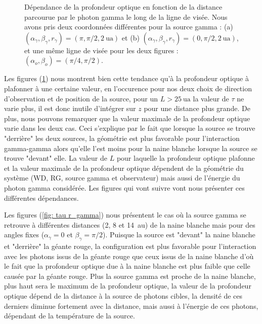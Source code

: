 \documentclass[a4paper,12pt,twoside]{article}
\begin{document}
\begin{figure}[H]
	\centering
    \hfill
    \hfill
    \caption{Dépendance de la profondeur optique en fonction de la distance parcourue par le photon gamma le long de la ligne de visée. Nous avons pris deux coordonnées différentes pour la source gamma : (a) $(\alpha_\gamma, \beta_\gamma, r_\gamma) = (\pi, \pi/2, \SI{2}{\astronomicalunit})$ et (b) $(\alpha_\gamma, \beta_\gamma, r_\gamma) = (0, \pi/2, \SI{2}{\astronomicalunit})$, et une même ligne de visée pour les deux figures : $(\alpha_o, \beta_o) = (\pi/4, \pi/2)$.}
    \label{fig: tau en fct de L}
\end{figure}

Les figures (\ref{fig: tau en fct de L}) nous montrent bien cette tendance qu'à la profondeur optique à plafonner à une certaine valeur, en l'occurence pour nos deux choix de direction d'observation et de position de la source, pour un $L > \SI{25}{\astronomicalunit}$ la valeur de $\tau$ ne varie plus, il est donc inutile d'intégrer sur $z$ pour une distance plus grande. De plus, nous pouvons remarquer que la valeur maximale de la profondeur optique varie dans les deux cas. Ceci s'explique par le fait que lorsque la source se trouve "derrière" les deux sources, la géométrie est plus favorable pour l'interaction gamma-gamma alors qu'elle l'est moins pour la naine blanche lorsque la source se trouve "devant" elle. La valeur de $L$ pour laquelle la profondeur optique plafonne et la valeur maximale de la profondeur optique dépendent de la géométrie du système (WD, RG, source gamma et observateur) mais aussi de l'énergie du photon gamma considérée. Les figures qui vont suivre vont nous présenter ces différentes dépendances.

Les figures (\ref{fig: tau r_gamma}) nous présentent le cas où la source gamma se retrouve à différentes distances (2, 8 et \SI{14}{\astronomicalunit}) de la naine blanche mais pour des angles fixes ($\alpha_\gamma = 0$ et $\beta_\gamma = \pi/2$). Puisque la source est "devant" la naine blanche et "derrière" la géante rouge, la configuration est plus favorable pour l'interaction avec les photons issus de la géante rouge que ceux issus de la naine blanche d'où le fait que la profondeur optique due à la naine blanche est plus faible que celle causée par la géante rouge. Plus la source gamma est proche de la naine blanche, plus haut sera le maximum de la profondeur optique, la valeur de la profondeur optique dépend de la distance à la source de photons cibles, la densité de ces derniers diminue fortement avec la distance, mais aussi à l'énergie de ces photons, dépendant de la température de la source.
\end{document}
